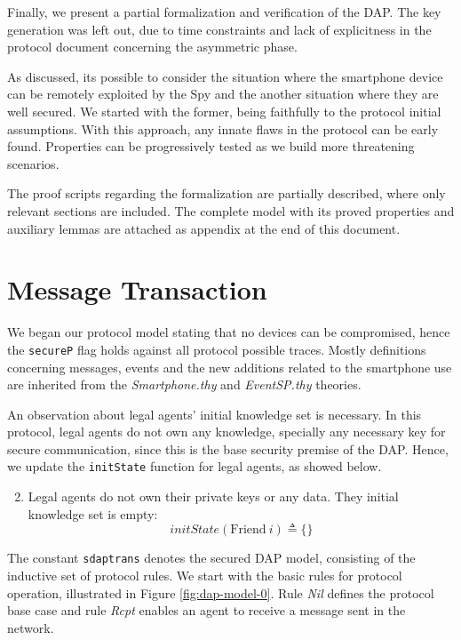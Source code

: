 Finally, we present a partial formalization and verification of the DAP\@. The key generation was left out, due to time constraints and lack of explicitness in the protocol document concerning the asymmetric phase.

As discussed, its possible to consider the situation where the smartphone device can be remotely exploited by the Spy and the another situation where they are well secured. We started with the former, being faithfully to the protocol initial assumptions. With this approach, any innate flaws in the protocol can be early found. Properties can be progressively tested as we build more threatening scenarios.

The proof scripts regarding the formalization are partially described, where only relevant sections are included. The complete model with its proved properties and auxiliary lemmas are attached as appendix at the end of this document.

\section{Message Transaction}
We began our protocol model stating that no devices can be compromised, hence the \texttt{secureP} flag holds against all protocol possible traces. Mostly definitions concerning messages, events and the new additions related to the smartphone use are inherited from the \textit{Smartphone.thy} and \textit{EventSP.thy} theories.

An observation about legal agents' initial knowledge set is necessary. In this protocol, legal agents do not own any knowledge, specially any necessary key for secure communication, since this is the base security premise of the DAP. Hence, we update the \texttt{initState} function for legal agents, as showed below.
%
\begin{enumerate}
  \setcounter{enumi}{1}

  \item Legal agents do not own their private keys or any data. They initial knowledge set is empty:
  \begin{equation*}
    initState (\text{Friend} \ i) \triangleq \{\}
  \end{equation*}
\end{enumerate}
%
The constant \texttt{sdaptrans} denotes the secured DAP model, consisting of the inductive set of protocol rules. We start with the basic rules for protocol operation, illustrated in Figure \ref{fig:dap-model-0}. Rule \textit{Nil} defines the protocol base case and rule \textit{Rcpt} enables an agent to receive a message sent in the network.

